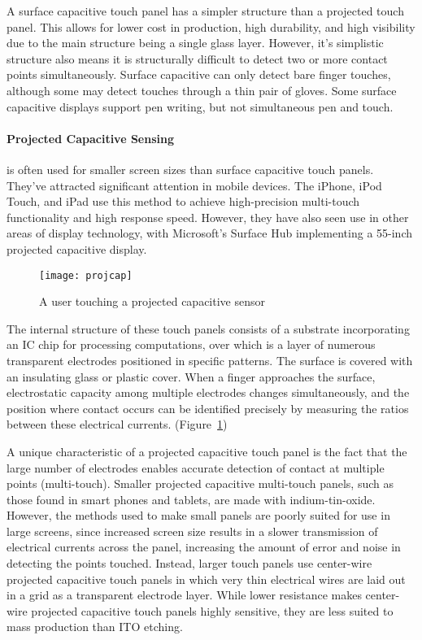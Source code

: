 A surface capacitive touch panel has a simpler structure than a projected touch panel.
This allows for lower cost in production, high durability, and high visibility due to the main structure being a single glass layer. 
However, it's simplistic structure also means it is structurally difficult to detect two or more contact points simultaneously.
Surface capacitive can only detect bare finger touches, although some may detect touches through a thin pair of gloves.
Some surface capacitive displays support pen writing, but not simultaneous pen and touch.

\paragraph{Projected Capacitive Sensing}

is often used for smaller screen sizes than surface capacitive touch panels. 
They've attracted significant attention in mobile devices. 
The iPhone, iPod Touch, and iPad use this method to achieve high-precision multi-touch functionality and high response speed.
However, they have also seen use in other areas of display technology, with Microsoft's Surface Hub implementing a 55-inch projected capacitive display.

\begin{figure}
\texttt{[image: projcap]}
\caption{A user touching a projected capacitive sensor \cite{touchtech}}
\label{fig:projcap}
\end{figure}

The internal structure of these touch panels consists of a substrate incorporating an IC chip for processing computations, over which is a layer of numerous transparent electrodes positioned in specific patterns. 
The surface is covered with an insulating glass or plastic cover. 
When a finger approaches the surface, electrostatic capacity among multiple electrodes changes simultaneously, and the position where contact occurs can be identified precisely by measuring the ratios between these electrical currents. (Figure~\ref{fig:projcap})

A unique characteristic of a projected capacitive touch panel is the fact that the large number of electrodes enables accurate detection of contact at multiple points (multi-touch).
Smaller projected capacitive multi-touch panels, such as those found in smart phones and tablets, are made with indium-tin-oxide.
However, the methods used to make small panels are poorly suited for use in large screens, since increased screen size results in a slower transmission of electrical currents across the panel, increasing the amount of error and noise in detecting the points touched.
Instead, larger touch panels use center-wire projected capacitive touch panels in which very thin electrical wires are laid out in a grid as a transparent electrode layer.
While lower resistance makes center-wire projected capacitive touch panels highly sensitive, they are less suited to mass production than ITO etching.

